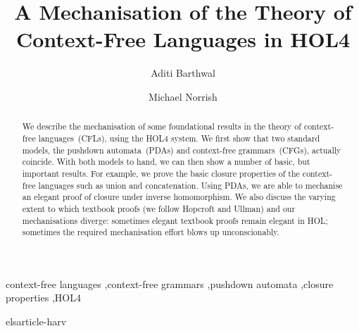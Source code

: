 \documentclass[1p,review,authoryear]{elsarticle}
\begin{document}
\begin{frontmatter}
\date{}

\title{A Mechanisation of the Theory of Context-Free Languages in HOL4}

\author[ab]{Aditi Barthwal}
\author[mn]{ Michael Norrish}
\address[ab]{Australian National University}
\address[mn]{Canberra Research Lab., NICTA}



\begin{abstract}
We describe the mechanisation of some foundational results in the theory of context-free languages~(CFLs), using the HOL4 system.
We first show that two standard models, the pushdown automata~(PDAs) and context-free grammars~(CFGs), actually coincide.
With both models to hand, we can then show a number of basic, but important results.
For example, we prove the basic closure properties of the context-free languages such as union and concatenation.
Using PDAs, we are able to mechanise an elegant proof of closure under inverse homomorphism.
We also discuss the varying extent to which textbook proofs (we follow Hopcroft and Ullman) and our mechanisations diverge: sometimes elegant textbook proofs remain elegant in HOL; sometimes the required mechanisation effort blows up unconscionably.
\end{abstract}

\begin{keyword}
context-free languages \sep context-free grammars \sep pushdown automata \sep closure properties \sep HOL4
\end{keyword}
\end{frontmatter}










 {elsarticle-harv}

\end{document}
